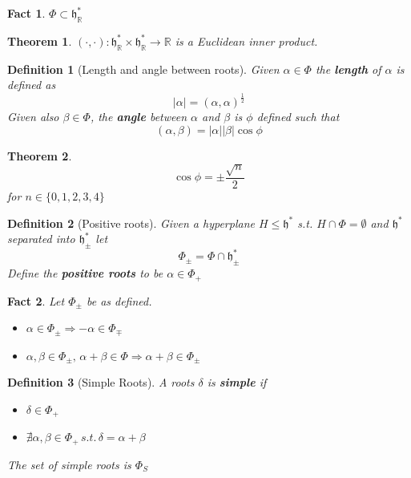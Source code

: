\documentclass{article}
\newtheorem{theorem}{Theorem}[subsection]
\newtheorem{definition}{Definition}[subsection]
\newtheorem{fact}{Fact}[subsection]
\newcommand{\bam}[1]{\textbf{#1}}
\newcommand{\mf}[1]{\mathfrak{#1}}
\newcommand{\mbb}[1]{\mathbb{#1}}
\begin{document}
\begin{fact}
$\Phi\subset\mf{h}^\ast_\mbb{R}$
\end{fact}

\begin{theorem}
$(\cdot,\cdot) : \mf{h}^\ast_\mbb{R} \times \mf{h}^\ast_\mbb{R} \to \mbb{R}$ is a Euclidean inner product. 
\end{theorem}

\begin{definition}[Length and angle between roots]
Given $\alpha\in\Phi$ the \bam{length} of $\alpha$ is defined as 
\[
|\alpha|=(\alpha,\alpha)^\frac{1}{2}
\]
Given also $\beta\in\Phi$, the \bam{angle} between $\alpha$ and $\beta$ is $\phi$ defined such that 
\[
(\alpha, \beta) = |\alpha||\beta|\cos{\phi}
\]
\end{definition}

\begin{theorem}
\[
\cos\phi=\pm\frac{\sqrt{n}}{2}
\]
for $n\in\lbrace 0,1,2,3,4 \rbrace$
\end{theorem}

\begin{definition}[Positive roots]
Given a hyperplane $H\leq\mf{h}^\ast$ s.t. $H\cap\Phi=\emptyset$ and $\mf{h}^\ast$ separated into $\mf{h}^\ast_\pm$ let 
\[
\Phi_\pm=\Phi\cap\mf{h}^\ast_\pm
\]
Define the \bam{positive roots} to be $\alpha\in\Phi_+$
\end{definition}

\begin{fact} Let $\Phi_\pm$ be as defined.
\begin{itemize}
    \item $\alpha\in\Phi_\pm \Rightarrow -\alpha\in\Phi_\mp$
    \item $\alpha,\beta\in\Phi_\pm,\, \alpha+\beta\in\Phi \Rightarrow \alpha+\beta\in\Phi_\pm$
\end{itemize}
\end{fact}

\begin{definition}[Simple Roots]
A roots $\delta$ is \bam{simple} if 
\begin{itemize}
\item $\delta\in\Phi_+$
\item $\nexists \alpha,\beta\in\Phi_+ \, s.t. \, \delta=\alpha+\beta$
\end{itemize}
The set of simple roots is $\Phi_S$
\end{definition}
\end{document}
